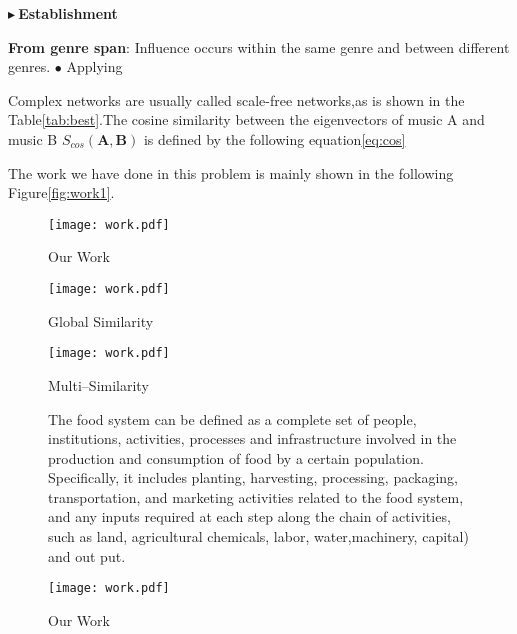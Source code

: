 \documentclass[12pt]{article}  %
\begin{document}
\newpage
\noindent$\blacktriangleright\ $\textbf{\large{Establishment}}

\textbf{From genre span}: Influence occurs within the same genre and between different genres.
$\bullet$ Applying 

Complex networks are usually called scale-free networks\cite{1},as is shown in the Table\eqref{tab:best}.The cosine similarity between the eigenvectors of music A and music B $S_{cos}(\mathbf{A},\mathbf{B})$ is defined by the following equation\eqref{eq:cos}


The work we have done in this problem is mainly shown in the following Figure\eqref{fig:work1}.
\vspace{-0.3cm}
\begin{figure}[htbp]
	\centering
	\texttt{[image: work.pdf]}
	\caption{Our Work}\label{fig:work1}
\end{figure}
\vspace{-0.3cm}

\begin{figure}[htbp]
	\centering
	\begin{minipage}[t]{0.45\textwidth}
		\centering
		\texttt{[image: work.pdf]}
		\caption{Global Similarity}\label{fig:quanju}
	\end{minipage}
	\begin{minipage}[t]{0.45\textwidth}
		\centering
		\texttt{[image: work.pdf]}
		\caption{Multi--Similarity}\label{fig:jubu}
	\end{minipage}
\end{figure}


\begin{figure}[htbp]
\begin{minipage}[b]{0.5\linewidth}
The food system can be defined as a complete set of people, institutions, activities, processes and infrastructure involved in the production and consumption of food by a certain population. Specifically, it includes planting, harvesting, processing, packaging, transportation, and marketing activities related to the food system, and any inputs required at each step along the chain of activities, such as land, agricultural chemicals, labor, water,machinery, capital) and out
put.      
\end{minipage}
\hfill
\begin{minipage}[b]{0.45\linewidth}
\texttt{[image: work.pdf]}
\caption{Our Work}
\end{minipage}
\end{figure}
\end{document}
